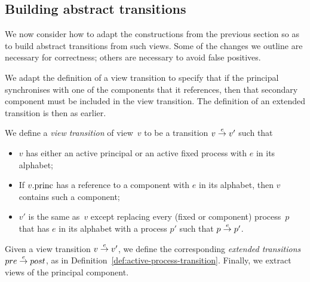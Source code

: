 
\subsection{Building abstract transitions}

We now consider how to adapt the constructions from the previous section so as
to build abstract transitions from such views.  Some of the changes we outline
are necessary for correctness; others are necessary to avoid false positives.



We adapt the definition of a view transition to specify that if the principal
synchronises with one of the components that it references, then that
secondary component must be included in the view transition.  The definition
of an extended transition is then as earlier. 
%
\begin{definition}
\label{def:active-process-transition-singleRef}
We define a \emph{view transition} of view~$v$ to be a transition $v \stackrel{e}\rightarrow
v'$ such that
%
\begin{itemize}
\item $v$ has either an active principal or an active fixed process with $e$
  in its alphabet;

\item If $v.\mathrm{princ}$ has a reference to a component with $e$ in its alphabet,
  then $v$ contains such a component;

\item $v'$ is the same as~$v$ except replacing every (fixed or component)
  process~$p$ that has $e$ in its alphabet with a process $p'$ such that \( p
  \stackrel{e}\rightarrow p' \).
\end{itemize}

Given a view transition $v \stackrel{e}\rightarrow v'$, we define the corresponding
\emph{extended transitions} $pre \stackrel{e}\rightarrow post$,  as in
Definition~\ref{def:active-process-transition}.  Finally, we extract views of
the principal component.  
\end{definition}



